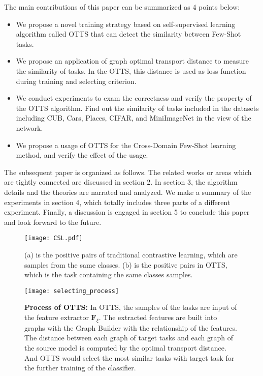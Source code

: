\documentclass[10pt,journal,compsoc]{IEEEtran}
\begin{document}
The main contributions of this paper can be summarized as 4 points below:

\begin{itemize}
    \item We propose a novel training strategy based on self-supervised learning algorithm called OTTS that can detect the similarity between Few-Shot tasks. 
    
    \item We propose an application of graph optimal transport distance to measure the similarity of tasks. In the OTTS, this distance is used as loss function during training and selecting criterion. 
    
    \item We conduct experiments to exam the correctness and verify the property of the OTTS algorithm. Find out the similarity of tasks included in the datasets including CUB, Cars, Places, CIFAR, and MiniImageNet in the view of the network.
    
    \item We propose a usage of OTTS for the Cross-Domain Few-Shot learning method, and verify the effect of the usage. 
\end{itemize}

The subsequent paper is organized as follows. The related works or areas which are tightly connected are discussed in section 2. In section 3, the algorithm details and the theories are narrated and analyzed. We make a summary of the experiments in section 4, which totally includes three parts of a different experiment. Finally, a discussion is engaged in section 5 to conclude this paper and look forward to the future.


 

\begin{figure}[t]
    \centering
    \texttt{[image: CSL.pdf]}
    \caption{(a) is the positive pairs of traditional contrastive learning, which are samples from the same classes. (b) is the positive pairs in OTTS, which is the task containing the same classes samples.}
    \label{CSL}
\end{figure}

\begin{figure*}[t]
    \centering
    \texttt{[image: selecting\_process]}
    \caption{\textbf{Process of OTTS:} In OTTS, the samples of the tasks are input of the feature extractor $\mathbf{F}_\xi$. The extracted features are built into graphs with the Graph Builder with the relationship of the features. The distance between each graph of target tasks and each graph of the source model is computed by the optimal transport distance. And OTTS would select the most similar tasks with target task for the further training of the classifier.}
    \label{OTTS_using}
\end{figure*}
\end{document}
